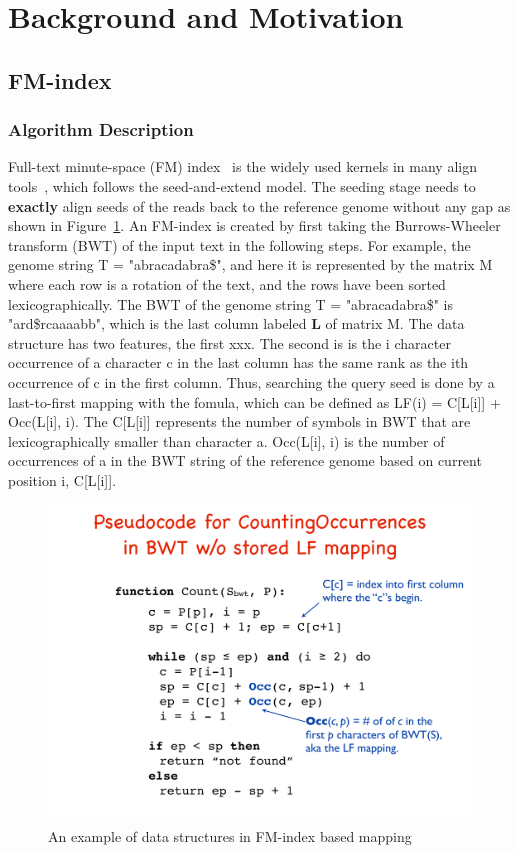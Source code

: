 \documentclass[9pt,conference]{IEEEtran}
\begin{document}
\section{Background and Motivation}
\subsection{FM-index}
\subsubsection{Algorithm Description}
Full-text minute-space (FM) index~\cite{bwt} is the widely used kernels in many align tools~\cite{ahmed2016comparison}, which follows the seed-and-extend model. The seeding stage needs to \textbf{exactly} align seeds of the reads back to the reference genome without any gap as shown in Figure~\ref{fig:algo-fm}. An FM-index is created by first taking the Burrows-Wheeler transform (BWT) of the input text in the following steps. For example,  the genome string T = "abracadabra\$",  and here it is represented by the matrix M where each row is a rotation of the text, and the rows have been sorted lexicographically.  The BWT of the genome string T = "abracadabra\$" is "ard\$rcaaaabb", which is the last column labeled \textbf{L} of matrix M. The data structure has two features, the first xxx. The second is is the i character occurrence of a character c in the last column has the same rank as the ith occurrence of c in the first column. Thus, searching the query seed is done by a last-to-first mapping with the fomula, which can be defined as LF(i) = C[L[i]] + Occ(L[i], i). The C[L[i]] represents the number of symbols in BWT that are lexicographically smaller than character a. Occ(L[i], i) is the number of occurrences of a in the BWT string of the reference genome based on current position i, C[L[i]].
\begin{figure}[htbp]
\centering
\includegraphics[scale=0.25]{Conference-LaTeX-template_10-17-19/fig/fm-algo.pdf}
\caption{An example of data structures in FM-index based mapping}
\label{fig:algo-fm}
\end{figure}
\end{document}
